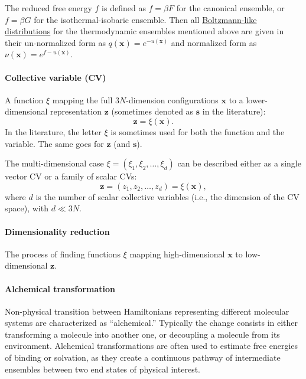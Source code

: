 \documentclass[9pt,review]{livecoms}
\newcommand{\vx}{\mathbf{x}}
\newcommand{\vz}{\mathbf{z}}
\begin{document}
The reduced free energy $f$ is defined as $f = \beta F$ for the canonical ensemble,
or $f = \beta G$ for the isothermal-isobaric ensemble.
Then all \hyperlink{ref:Distribution} {Boltzmann-like distributions} for the thermodynamic ensembles mentioned above are given in their un-normalized form as $q(\vx) = e^{-u(\vx)}$ and normalized form as
  $\nu(\vx) = e^{f-u(\vx)}$.


\hypertarget{ref:CV}{\paragraph{Collective variable (CV)}} A function $\xi$ mapping the full $3N$-dimension configurations $\vx$ to a lower-dimensional representation $\vz$ (sometimes denoted as $\mathbf{s}$ in the literature):
\begin{equation}
\vz = \xi(\vx).
\end{equation}
In the literature, the letter $\xi$ is sometimes used for both the function and the variable. The same goes for $\vz$ (and $\mathbf{s}$).

The multi-dimensional case $\xi= (\xi_1,\xi_2,\ldots,\xi_d)$ can be described either as a single vector CV or a family of scalar CVs:
\begin{equation}
\vz = (z_1, z_2, \ldots, z_d) = \xi(\vx),
\end{equation}
where $d$ is the number of scalar collective variables (i.e., the dimension of the CV space), with $d\ll 3N$.


\hypertarget{ref:DimRed} {\paragraph{Dimensionality reduction}}
The process of finding functions $\xi$ mapping high-dimensional $\vx$ to low-dimensional $\vz$.

\hypertarget{ref:Alchemical} {\paragraph{Alchemical transformation}}
Non-physical transition between Hamiltonians representing different molecular systems are characterized as ``alchemical.'' Typically the change consists in either transforming a molecule into another one, or decoupling a molecule from its environment. Alchemical transformations are often used to estimate free energies of binding or solvation, as they create a continuous pathway of intermediate ensembles between two end states of physical interest.
\end{document}
